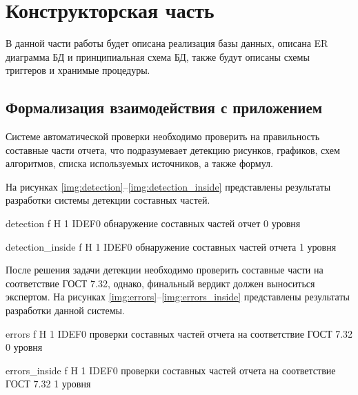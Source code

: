 
\chapter{Конструкторская часть}
В данной части работы будет описана реализация базы данных, описана ER диаграмма БД и принципиальная схема БД, также будут описаны схемы триггеров и хранимые процедуры.


\section{Формализация взаимодействия с приложением}


Системе автоматической проверки необходимо проверить на правильность составные части отчета, что подразумевает детекцию рисунков, графиков, схем алгоритмов, списка используемых источников, а также формул.

На рисунках \ref{img:detection}--\ref{img:detection_inside} представлены результаты разработки системы детекции составных частей.

{detection} %
{f} %
{H} %
{1\textwidth} %
{IDEF0 обнаружение составных частей отчет 0 уровня} %

{detection_inside} %
{f} %
{H} %
{1\textwidth} %
{IDEF0 обнаружение составных частей отчета 1 уровня} %

После решения задачи детекции необходимо проверить составные части на соответствие ГОСТ 7.32, однако, финальный вердикт должен выноситься экспертом. На рисунках \ref{img:errors}--\ref{img:errors_inside} представлены результаты разработки данной системы.

{errors} %
{f} %
{H} %
{1\textwidth} %
{IDEF0 проверки составных частей отчета на соответствие ГОСТ 7.32 0 уровня} %

{errors_inside} %
{f} %
{H} %
{1\textwidth} %
{IDEF0 проверки составных частей отчета на соответствие ГОСТ 7.32 1 уровня} %
\newpage
